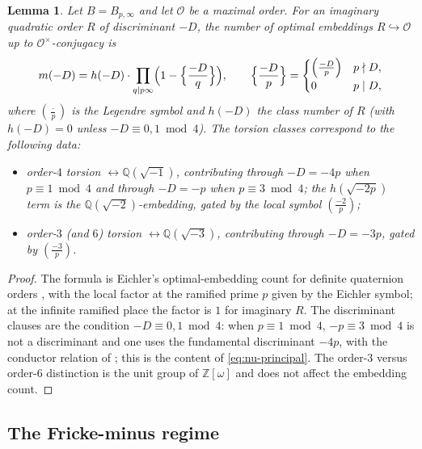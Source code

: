 \documentclass[10pt,a4paper]{amsart}
\newtheorem{lemma}[theorem]{Lemma}
\newcommand{\Q}{\mathbb{Q}}
\newcommand{\Z}{\mathbb{Z}}
\newcommand{\Onorm}{\mathcal{O}}
\providecommand{\kro}[2]{\left(\frac{#1}{#2}\right)}
\begin{document}
	\begin{lemma}	\label{lem:twist}
		Let $B=B_{p,\infty}$ and let $\Onorm$ be a maximal order. For an imaginary
		quadratic order $R$ of discriminant $-D$, the number of optimal embeddings
		$R\hookrightarrow\Onorm$ up to $\Onorm^\times$-conjugacy is
		\[
		m(-D)=h(-D)\cdot\prod_{q\mid p\infty}
		\Bigl(1-\Bigl\{\frac{-D}{q}\Bigr\}\Bigr),
		\qquad
		\Bigl\{\frac{-D}{p}\Bigr\}=
		\begin{cases}\kro{-D}{p} & p\nmid D,\\ 0 & p\mid D,\end{cases}
		\]
		where $\kro{\cdot}{p}$ is the Legendre symbol and $h(-D)$ the class number
		of $R$ (with $h(-D)=0$ unless $-D\equiv0,1\bmod4$). The torsion classes
		correspond to the following data:
		\begin{itemize}
			\item[$(\ell{=}2)$] order-$4$ torsion $\leftrightarrow\Q(\sqrt{-1})$,
			contributing through $-D=-4p$ when $p\equiv1\bmod4$ and through $-D=-p$
			when $p\equiv3\bmod4$; the $h(\sqrt{-2p})$ term is the
			$\Q(\sqrt{-2})$-embedding, gated by the local symbol $\kro{-2}{p}$;
			\item[$(\ell{=}3)$] order-$3$ (and $6$) torsion $\leftrightarrow\Q(\sqrt{-3})$,
			contributing through $-D=-3p$, gated by $\kro{-3}{p}$.
		\end{itemize}
	\end{lemma}
	
	\begin{proof}
		The formula is Eichler's optimal-embedding count for definite quaternion
		orders \cite[Ch.~III]{Vigneras}, with the local factor at the ramified
		prime $p$ given by the Eichler symbol; at the infinite ramified place the
		factor is $1$ for imaginary $R$. The discriminant clauses are the
		condition $-D\equiv0,1\bmod4$: when $p\equiv1\bmod4$, $-p\equiv3\bmod4$
		is not a discriminant and one uses the fundamental discriminant $-4p$,
		with the conductor relation of \cite[Cor.~7.28]{Cox}; this is the content
		of \eqref{eq:nu-principal}. The order-$3$ versus order-$6$ distinction is
		the unit group of $\Z[\omega]$ and does not affect the embedding count.
	\end{proof}
	
	\subsection{The Fricke-minus regime}
	\label{ss:uncond-regime}
	
\end{document}
